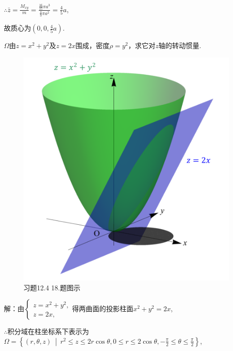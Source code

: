\documentclass[12pt,UTF8]{ctexart}
\newcommand\Set[2]{\left\{#1\ \middle\vert\ #2 \right\}}
\begin{document}
\begin{enumerate}
$\therefore\bar{z}=\frac{M_{xy}}m=\frac{\frac{16}{15}\pi a^3}{\frac43\pi a^2}=\frac45a$,

故质心为$(0,0,\frac45a)$.

$\Omega$由$z=x^2+y^2$及$z=2x$围成，密度$\rho=y^2$，求它对$z$轴的转动惯量.

\begin{figure}[H]
\begin{center}
\includegraphics[height=0.4\textheight]{Figures19/Fig12-4-18.pdf}
\end{center}
\caption{习题12.4 18.题图示}
\label{12-4-18}
\end{figure}

解：由$\begin{cases}
z=x^2+y^2,\\
z=2x,
\end{cases}$得两曲面的投影柱面$x^2+y^2=2x$,

$\therefore$积分域在柱坐标系下表示为$\Omega=\Set{(r,\theta,z)}{r^2\leqslant z\leqslant 2r\cos\theta,0\leqslant r\leqslant2\cos\theta,-\frac\pi2\leqslant\theta\leqslant\frac\pi2}$,


\end{enumerate}
\end{document}
